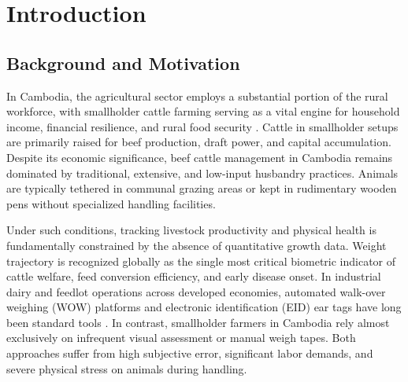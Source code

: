 \documentclass[11pt,a4paper]{report}
\begin{document}
\clearpage

\setcounter{tocdepth}{1}

\tableofcontents
\clearpage

\listoftables
\listoffigures
\clearpage

\setcounter{page}{7}

\chapter{Introduction}

\section{Background and Motivation}
In Cambodia, the agricultural sector employs a substantial portion of the rural workforce, with smallholder cattle farming serving as a vital engine for household income, financial resilience, and rural food security \cite{phem2023current}. Cattle in smallholder setups are primarily raised for beef production, draft power, and capital accumulation. Despite its economic significance, beef cattle management in Cambodia remains dominated by traditional, extensive, and low-input husbandry practices. Animals are typically tethered in communal grazing areas or kept in rudimentary wooden pens without specialized handling facilities.

Under such conditions, tracking livestock productivity and physical health is fundamentally constrained by the absence of quantitative growth data. Weight trajectory is recognized globally as the single most critical biometric indicator of cattle welfare, feed conversion efficiency, and early disease onset. In industrial dairy and feedlot operations across developed economies, automated walk-over weighing (WOW) platforms and electronic identification (EID) ear tags have long been standard tools \cite{dickinson2013automated}. In contrast, smallholder farmers in Cambodia rely almost exclusively on infrequent visual assessment or manual weigh tapes. Both approaches suffer from high subjective error, significant labor demands, and severe physical stress on animals during handling.
\end{document}
